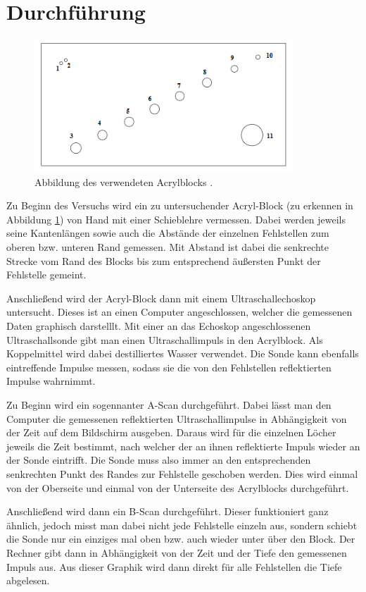 \section{Durchführung}
\label{sec:Durchführung}
\begin{figure}[H]
  \centering
  \includegraphics[height=5cm]{acryl.PNG}
  \caption{Abbildung des verwendeten Acrylblocks \cite{sample}.}
  \label{fig:acryl}
\end{figure}
Zu Beginn des Versuchs wird ein zu untersuchender Acryl-Block (zu erkennen in Abbildung \ref{fig:acryl})
von Hand mit einer Schieblehre vermessen. Dabei werden jeweils seine Kantenlängen sowie auch die
Abstände der einzelnen Fehlstellen zum oberen bzw. unteren Rand gemessen. Mit Abstand ist dabei die
senkrechte Strecke vom Rand des Blocks bis zum entsprechend äußersten Punkt der Fehlstelle gemeint.

Anschließend wird der Acryl-Block dann mit einem Ultraschallechoskop untersucht. Dieses ist an
einen Computer angeschlossen, welcher die gemessenen Daten graphisch darstelllt.
Mit einer an das Echoskop angeschlossenen Ultraschallsonde gibt man einen Ultraschallimpuls
in den Acrylblock. Als Koppelmittel wird dabei destilliertes Wasser verwendet. Die Sonde
kann ebenfalls eintreffende Impulse messen, sodass sie die von den Fehlstellen reflektierten
Impulse wahrnimmt.

Zu Beginn wird ein sogennanter A-Scan durchgeführt. Dabei lässt man den Computer die gemessenen
reflektierten Ultraschallimpulse in Abhängigkeit von der Zeit auf dem Bildschirm ausgeben.
Daraus wird für die einzelnen Löcher jeweils die Zeit bestimmt, nach welcher der an ihnen
reflektierte Impuls wieder an der Sonde eintrifft. Die Sonde muss also immer an den entsprechenden senkrechten
Punkt des Randes zur Fehlstelle geschoben werden. Dies wird einmal von der Oberseite und einmal
von der Unterseite des Acrylblocks durchgeführt.

Anschließend wird dann ein B-Scan durchgeführt. Dieser funktioniert ganz ähnlich, jedoch misst man
dabei nicht jede Fehlstelle einzeln aus, sondern schiebt die Sonde nur ein einziges mal oben bzw. auch wieder
unter über den Block. Der Rechner gibt dann in Abhängigkeit von der Zeit und der Tiefe den gemessenen
Impuls aus. Aus dieser Graphik wird dann direkt für alle Fehlstellen die Tiefe abgelesen.

